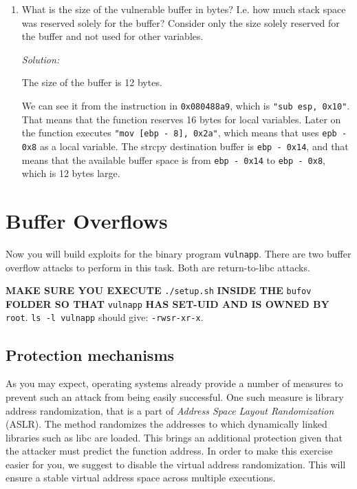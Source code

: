 \documentclass[a4paper,11pt]{article}
\newenvironment{solution}%
{\par{\noindent\small\textit{Solution:}}\vspace{-12pt}\begin{framed}}%
{\end{framed}\par}
\begin{document}
\begin{enumerate}
\begin{enumerate}
\item
\ifsolution\begin{solution}
\begin{drawstack}
	\startframe
	\startframe
	 
\end{drawstack}
\end{solution}\fi
\end{enumerate}


\item What is the size of the vulnerable buffer in bytes? I.e. how much stack space was reserved solely for the buffer? Consider only the size solely reserved for the buffer and not used for other variables.


\ifsolution\begin{solution}
	The size of the buffer is 12 bytes. 

	We can see it from the instruction in \texttt{0x080488a9}, which is \texttt{"sub esp, 0x10"}. That means that
	the function reserves 16 bytes for local variables.
	Later on the function executes \texttt{"mov [ebp - 8], 0x2a"}, which means that uses \texttt{epb - 0x8} as a local variable.
	The strcpy destination buffer is \texttt{ebp - 0x14}, and that means that the available buffer space is from
	\texttt{ebp - 0x14} to \texttt{ebp - 0x8}, which is 12 bytes large.
\end{solution}\fi
\end{enumerate}


\section*{Buffer Overflows}
Now you will build exploits for the binary program {\tt vulnapp}. There are two buffer overflow attacks to perform in this task. Both are return-to-libc attacks.

\textbf{MAKE SURE YOU EXECUTE }\texttt{./setup.sh}\textbf{ INSIDE THE }\texttt{bufov}\textbf{ FOLDER SO THAT }\texttt{vulnapp}\textbf{ HAS SET-UID AND IS OWNED BY} \texttt{root}. \texttt{ls -l vulnapp} should give: \texttt{-rwsr-xr-x}.

\subsection*{Protection mechanisms}
As you may expect, operating systems already provide a number of measures to
prevent such an attack from being easily successful. One such measure is library
address randomization, that is a part of \textit{Address Space Layout
Randomization} (ASLR). The method randomizes the addresses to which dynamically
linked libraries such as libc are loaded. This brings an additional protection
given that the attacker must predict the function address. In order to make this
exercise easier for you, we suggest to disable the virtual address
randomization. This will ensure a stable virtual address space across multiple
executions. 
\end{document}
